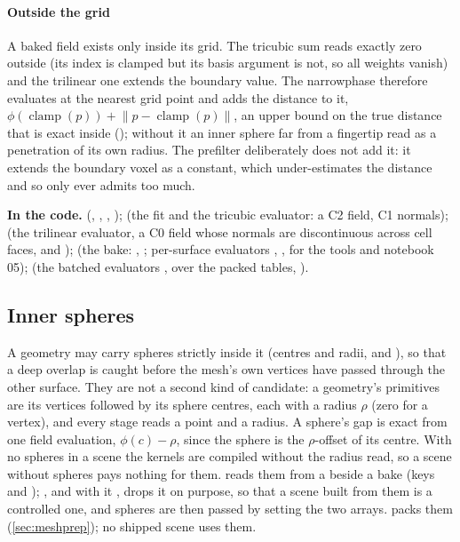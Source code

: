 \paragraph{Outside the grid} A baked field exists only inside its grid. The tricubic sum reads exactly zero outside (its index is clamped but its basis argument is not, so all weights vanish) and the trilinear one extends the boundary value. The narrowphase therefore evaluates at the nearest grid point and adds the distance to it, $\phi(\operatorname{clamp}(p)) + \lVert p - \operatorname{clamp}(p)\rVert$, an upper bound on the true distance that is exact inside (); without it an inner sphere far from a fingertip read as a penetration of its own radius. The prefilter deliberately does not add it: it extends the boundary voxel as a constant, which under-estimates the distance and so only ever admits too much.

\begin{codebox}
\textbf{In the code.}  (, , , );  (the fit and the tricubic evaluator: a C2 field, C1 normals);  (the trilinear evaluator, a C0 field whose normals are discontinuous across cell faces, and );  (the bake: , ; per-surface evaluators , ,  for the tools and notebook 05);  (the batched evaluators ,  over the packed tables, ).
\end{codebox}

\subsection{Inner spheres}\label{sec:spheres}

A geometry may carry spheres strictly inside it (centres and radii,  and ), so that a deep overlap is caught before the mesh's own vertices have passed through the other surface. They are not a second kind of candidate: a geometry's primitives are its vertices followed by its sphere centres, each with a radius $\rho$ (zero for a vertex), and every stage reads a point and a radius. A sphere's gap is exact from one field evaluation, $\phi(c) - \rho$, since the sphere is the $\rho$-offset of its centre. With no spheres in a scene the kernels are compiled without the radius read, so a scene without spheres pays nothing for them.  reads them from a  beside a bake (keys  and ); , and with it , drops it on purpose, so that a scene built from them is a controlled one, and spheres are then passed by setting the two arrays.  packs them (\cref{sec:meshprep}); no shipped scene uses them.

